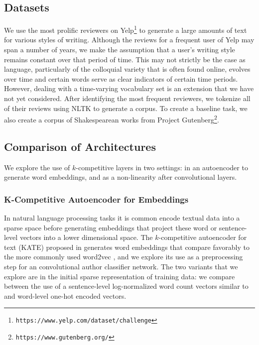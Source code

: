 \documentclass{vldb}
\begin{document}
\subsection{Datasets}
We use the most prolific reviewers on Yelp\footnote{{\texttt{https://www.yelp.com/dataset/challenge}}} to generate a large amounts of text for various styles of writing. Although the reviews for a frequent user of Yelp may span a number of years, we make the assumption that a user's writing style remains constant over that period of time. This may not strictly be the case as language, particularly of the colloquial variety that is often found online, evolves over time and certain words serve as clear indicators of certain time periods. However, dealing with a time-varying vocabulary set is an extension that we have not yet considered. After identifying the most frequent reviewers, we tokenize all of their reviews using NLTK \cite{Loper02nltk:the} to generate a corpus. To create a baseline task, we also create a corpus of Shakespearean works from Project Gutenberg\footnote{{\texttt{https://www.gutenberg.org/}}}. 

\subsection{Comparison of Architectures}
We explore the use of $k$-competitive layers in two settings: in an autoencoder to generate word embeddings, and as a non-linearity after convolutional layers. 

\subsubsection{K-Competitive Autoencoder for Embeddings}
In natural language processing tasks it is common encode textual data into a sparse space before generating embeddings that project these word or sentence-level vectors into a lower dimensional space. The $k$-competitive autoencoder for text (KATE) proposed in \cite{KATE} generates word embeddings that compare favorably to the more commonly used word2vec \cite{Mikolov13}, and we explore its use as a preprocessing step for an convolutional author classifier network. The two variants that we explore are in the initial sparse representation of training data: we compare between the use of a sentence-level log-normalized word count vectors similar to \cite{KATE} and word-level one-hot encoded vectors. 
\end{document}
